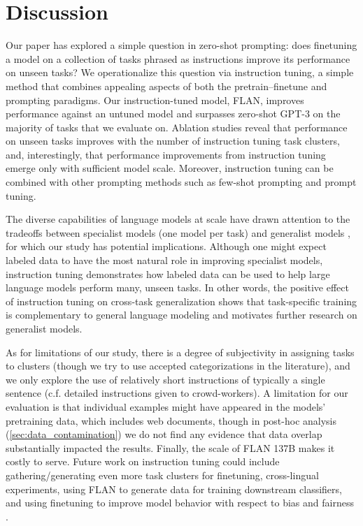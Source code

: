 \section{Discussion}

Our paper has explored a simple question in zero-shot prompting: does finetuning a model on a collection of tasks phrased as instructions improve its performance on unseen tasks? We operationalize this question via instruction tuning, a simple method that combines appealing aspects of both the pretrain--finetune and prompting paradigms. Our instruction-tuned model, FLAN, improves performance against an untuned model and surpasses zero-shot GPT-3 on the majority of tasks that we evaluate on. Ablation studies reveal that performance on unseen tasks improves with the number of instruction tuning task clusters, and, interestingly, that performance improvements from instruction tuning emerge only with sufficient model scale. Moreover, instruction tuning can be combined with other prompting methods such as few-shot prompting and prompt tuning.

The diverse capabilities of language models at scale have drawn attention to the tradeoffs between specialist models (one model per task) and generalist models \citep[one model for many tasks;][]{arivazhagan2019massively,pratap2020massively}, for which our study has potential implications. Although one might expect labeled data to have the most natural role in improving specialist models, instruction tuning demonstrates how labeled data can be used to help large language models perform many, unseen tasks. In other words, the positive effect of instruction tuning on cross-task generalization shows that task-specific training is complementary to general language modeling and motivates further research on generalist models. 

As for limitations of our study, there is a degree of subjectivity in assigning tasks to clusters (though we try to use accepted categorizations in the literature), and we only explore the use of relatively short instructions of typically a single sentence (c.f. detailed instructions given to crowd-workers). A limitation for our evaluation is that individual examples might have appeared in the models’ pretraining data, which includes web documents, though in post-hoc analysis (\ref{sec:data_contamination}) we do not find any evidence that data overlap substantially impacted the results. Finally, the scale of FLAN 137B makes it costly to serve. Future work on instruction tuning could include gathering/generating even more task clusters for finetuning, cross-lingual experiments, using FLAN to generate data for training downstream classifiers, and using finetuning to improve model behavior with respect to bias and fairness \citep{solaiman2021process}. 

